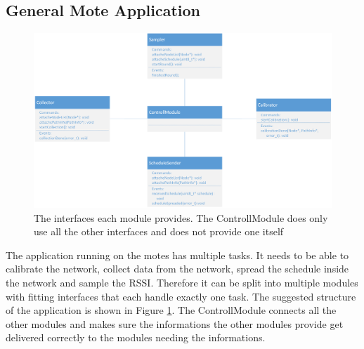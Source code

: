 \subsection{General Mote Application}
\begin{figure}[htbp]
	\centering
    \includegraphics[scale=0.6]{content/images/Motes/GeneralStructure}
   	\caption{The interfaces each module provides. The ControllModule does only use all the other interfaces and does not provide one itself}
    \label{fig:moteStructure}
\end{figure}
The application running on the motes has multiple tasks. It needs to be able to calibrate the network, collect data from the network, spread the schedule inside the network and sample the RSSI. Therefore it can be split into multiple modules with fitting interfaces that each handle exactly one task. The suggested structure of the application is shown in Figure \ref{fig:moteStructure}. The ControllModule connects all the other modules and makes sure the informations the other modules provide get delivered correctly to the modules needing the informations.     
